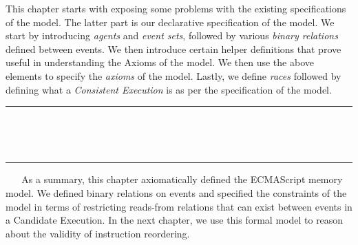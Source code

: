 This chapter starts with exposing some problems with the existing specifications of the model. 
The latter part is our declarative specification of the model. 
We start by introducing \textit{agents} and \textit{event sets}, followed by various \textit{binary relations} defined between events. 
We then introduce certain helper definitions that prove useful in understanding the Axioms of the model. 
We then use the above elements to specify the \textit{axioms} of the model.
Lastly, we define \textit{races} followed by defining what a \textit{Consistent Execution} is as per the specification of the model.  
\ \newline
\ \newline  
\hrule 
\ \newline 
\ \newline 



















\ \newline
\ \newline  
\hrule 
\ \newline 
\ \newline 
As a summary, this chapter axiomatically defined the ECMAScript memory model. 
We defined binary relations on events and specified the constraints of the model in terms of restricting reads-from relations that can exist between events in a Candidate Execution.
In the next chapter, we use this formal model to reason about the validity of instruction reordering.